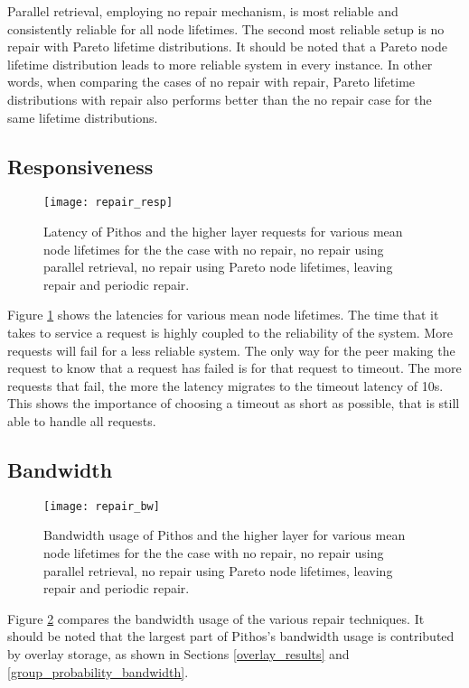 Parallel retrieval, employing no repair mechanism, is most reliable and consistently reliable for all node lifetimes. The second most reliable setup is no repair with Pareto lifetime distributions. It should be noted that a Pareto node lifetime distribution leads to more reliable system in every instance. In other words, when comparing the cases of no repair with repair, Pareto lifetime distributions with repair also performs better than the no repair case for the same lifetime distributions.

\subsection{Responsiveness}

\begin{figure}[htbp]
 \centering
 \texttt{[image: repair\_resp]}
 \caption{Latency of Pithos and the higher layer requests for various mean node lifetimes for the the case with no repair, no repair using parallel retrieval, no repair using Pareto node lifetimes, leaving repair and periodic repair.}
 \label{fig_repair_resp}
\end{figure}
%
Figure \ref{fig_repair_resp} shows the latencies for various mean node lifetimes. The time that it takes to service a request is highly coupled to the reliability of the system. More requests will fail for a less reliable system. The only way for the peer making the request to know that a request has failed is for that request to timeout. The more requests that fail, the more the latency migrates to the timeout latency of 10s. This shows the importance of choosing a timeout as short as possible, that is still able to handle all requests.

\subsection{Bandwidth}

\begin{figure}[htbp]
 \centering
 \texttt{[image: repair\_bw]}
 \caption{Bandwidth usage of Pithos and the higher layer for various mean node lifetimes for the the case with no repair, no repair using parallel retrieval, no repair using Pareto node lifetimes, leaving repair and periodic repair.}
 \label{fig_repair_bw}
\end{figure}
%
Figure \ref{fig_repair_bw} compares the bandwidth usage of the various repair techniques. It should be noted that the largest part of Pithos's bandwidth usage is contributed by overlay storage, as shown in Sections \ref{overlay_results} and \ref{group_probability_bandwidth}.


